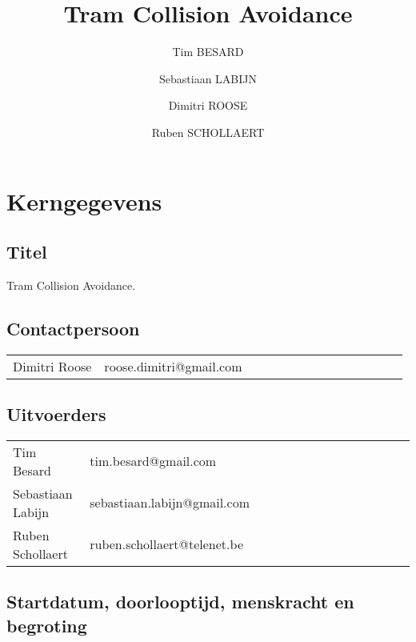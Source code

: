 \documentclass[]{book}
\begin{document}
%
%

\title{Tram Collision Avoidance}
\author{Tim BESARD \and Sebastiaan LABIJN \and Dimitri ROOSE \and Ruben SCHOLLAERT}
\date{ }
\maketitle


%
%

\section{Kerngegevens}\label{sec:kerngegevens}

\subsection{Titel}\label{sec:Titel}

Tram Collision Avoidance.

\subsection{Contactpersoon} \label{sec:Contactpersoon}

\begin{table}[h]
		\begin{tabular}{*{14}{l}}
		Dimitri Roose & roose.dimitri@gmail.com \\
		\end{tabular}
\end{table}

\subsection{Uitvoerders}\label{sec:Uitvoerders}

\begin{table}[h]
		\begin{tabular}{*{14}{l}}
		Tim Besard & tim.besard@gmail.com \\
		Sebastiaan Labijn & sebastiaan.labijn@gmail.com \\
		Ruben Schollaert & ruben.schollaert@telenet.be \\	
		\end{tabular}
\end{table}

\subsection{Startdatum, doorlooptijd, menskracht en begroting}\label{sec:Startdatum}
\end{document}

